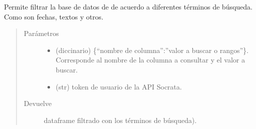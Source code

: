 \documentclass[letterpaper,10pt,openany,spanish]{sphinxmanual}
\begin{document}
\begin{fulllineitems}
\label{\detokenize{datos_gov:datos_gov.filtrar_tabla}}
Permite filtrar la base de datos de  de acuerdo a        diferentes términos de búsqueda. Como son fechas, textos y otros.
\begin{quote}\begin{description}
\item[{Parámetros}] \leavevmode\begin{itemize}
\item {} 
 \textendash{} (diccinario) \{“nombre de columna”:”valor a buscar o rangos”\}. Corresponde al nombre de la columna a consultar y el valor a buscar.

\item {} 
 \textendash{} (str)  \sphinxhyphen{} token de usuario de la API Socrata.

\end{itemize}

\item[{Devuelve}] \leavevmode
dataframe  filtrado con los términos de búsqueda).

\end{description}\end{quote}

\end{fulllineitems}

\end{document}
